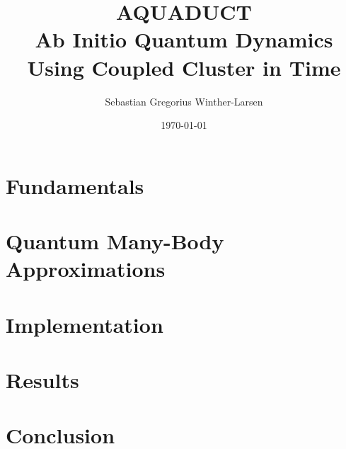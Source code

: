 \documentclass[twoside, english, notitlepage, 11pt]{uiofysmaster}
\author{Sebastian Gregorius Winther-Larsen}
\title{\textbf{AQUADUCT} \\ 
    \textbf{A}b Initio \textbf{Qua}ntum 
    \textbf{D}ynamics \\ \textbf{U}sing 
    \textbf{C}oupled Cluster in 
    \textbf{T}ime
}
\date{\today}
\begin{document}
\frontmatter
    \maketitle

    \begin{abstract}
    
    \end{abstract}
    
    \begin{acknowledgements}
    
    \end{acknowledgements} 

    \tableofcontents

\mainmatter

    

    \part{Fundamentals}

        
        

    \part{Quantum Many-Body Approximations}

        
        
        

    \part{Implementation}

        
         
    
    \part{Results}
   
        
        

    \part{Conclusion}
\end{document}
